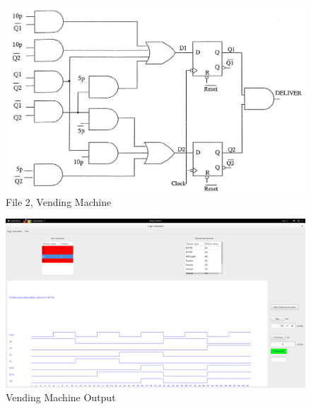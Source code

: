 \documentclass[12pt]{article}
\begin{document}
\begin{figure}[H]
  \centering
  \includegraphics[width=0.9\linewidth]{figures/Test102.png}
  \captionsetup{width=.7\linewidth}
  \caption{File 2, Vending Machine}
  \label{fig:3}
\end{figure}
\begin{figure}[H]
	\centering
	\includegraphics[width=0.9\linewidth]{figures/102_OUTPUT.png}
	\captionsetup{width=.7\linewidth}
	\caption{Vending Machine Output}
	\label{fig:4}
\end{figure}
\end{document}
